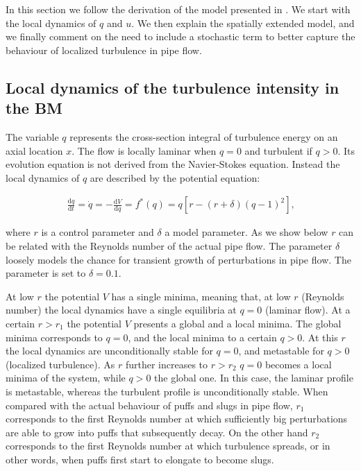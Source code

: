 \documentclass{article}
\begin{document}
In this section we follow the derivation of the model presented in \cite{barkley2016}. We start with the local dynamics of $q$ and $u$. We then explain the spatially extended model, and we finally comment on the need to include a stochastic term to better capture the behaviour of localized turbulence in pipe flow.





\subsection{Local dynamics of the turbulence intensity in the BM}
The variable $q$ represents the cross-section integral of turbulence energy on an axial location $x$. The flow is locally laminar when $q=0$ and turbulent if $q>0$. Its evolution equation is not derived from the Navier-Stokes equation. Instead the local dynamics of $q$ are described by the potential equation:

\begin{align}
\frac{\mathrm{d}q}{\mathrm{d}t}=\dot{q}= - \frac{\mathrm{d}V}{\mathrm{d}q}= f^{*} \left(q \right)=q \left[r-\left(r+\delta \right) \left(q -1 \right)^{2} \right]\text{,}
\label{eq:loc_q_0}
\end{align}

where $r$ is a control parameter and $\delta$ a model parameter. As we show below $r$ can be related with the Reynolds number of the actual pipe flow. The parameter $\delta$ loosely models the chance for transient growth of perturbations in pipe flow. The parameter is set to $\delta=0.1$. 

At low $r$ the potential $V$ has a single minima, meaning that, at low $r$ (Reynolds number) the local dynamics have a single equilibria at $q=0$ (laminar flow). At a certain $r>r_{1}$ the potential $V$ presents a global and a local minima. The global minima corresponds to $q=0$, and the local minima to a certain $q>0$. At this $r$ the local dynamics are unconditionally stable for $q=0$, and metastable for $q>0$ (localized turbulence). As $r$ further increases to $r>r_{2}$ $q=0$ becomes a local minima of the system, while $q>0$ the global one. In this case, the laminar profile is metastable, whereas the turbulent profile is unconditionally stable. When compared with the actual behaviour of puffs and slugs in pipe flow, $r_{1}$ corresponds to the first Reynolds number at which sufficiently big perturbations are able to grow into puffs that subsequently decay. On the other hand $r_{2}$ corresponds to the first Reynolds number at which turbulence spreads, or in other words, when puffs first start to elongate to become slugs. 
\end{document}
